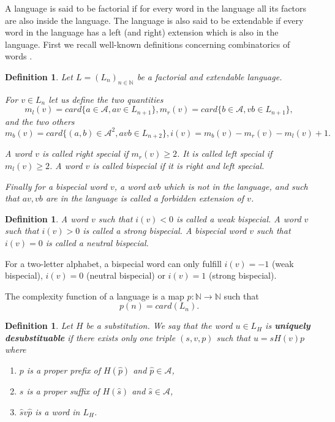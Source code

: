 \documentclass[11 pt]{article}
\newtheorem{definition}[proposition]{Definition}
\newcommand {\CL}{{\mathcal L}}
\newcommand{\wh}{\widehat}
\theoremstyle{definition}
\begin{document}
A language is said to be factorial if for every word in the language all its factors are also inside the language. The language is also said to be extendable if every word in the language has a left (and right) extension which is also in the language. First we recall well-known definitions concerning combinatorics of words \cite{Cass.94}. 
\begin{definition}\label{def-bispe}
Let $L=(L_n)_{n\in\mathbb{N}}$ be a factorial and extendable language. 

 For $v \in L_n$ let us define the two quantities
$$
m_{l}(v)= card\{a\in \mathcal{A}, av\in L_{n+1}\},  m_{r}(v)= card\{b\in \mathcal{A},vb\in L_{n+1}\},$$
and the two others
$$m_{b}(v)= card\{(a,b)\in \mathcal{A}^2, avb\in L_{n+2}\},
i(v) = m_b(v)-m_r(v)-m_l(v)+1.$$

A word $v$ is called right special if $m_{r}(v)\geq 2$. It is called left special if $m_{l}(v)\geq 2$. A word $v$ is called bispecial if it is right and left special. 

Finally for a bispecial word $v$, a word $avb$ which is not in the language, and such that $av, vb$ are in the language is called a forbidden extension of $v$.

\end{definition}

\begin{definition}
A  word $v$ such that $i(v)< 0$ is called a weak bispecial. 
A word $v$ such that $i(v)>0$ is called a strong bispecial.
A bispecial word $v$ such that $i(v)=0$ is called a neutral bispecial.
\end{definition}
For a two-letter alphabet, a bispecial word can only fulfill $i(v)=-1$ (weak bispecial), $i(v)=0$ (neutral bispecial) or $i(v)=1$ (strong bispecial).

The complexity function of a language is a map $p:\mathbb N\rightarrow \mathbb N$ such that 
$$p(n)=card (L_n).$$

 

%
\begin{definition}
Let $H$ be a substitution. 
We say that the word $u\in L_H$ is {\bf uniquely desubstituable} if there exists only one triple $(s,v,p)$ such that $u=sH(v)p$ %
where 
\begin{enumerate}
\item $p$ is a proper prefix of $H(\wh p)$ and $\wh p\in \mathcal A$,
\item $s$ is a proper suffix of $H(\wh s)$ and $\wh s\in \mathcal A$,
\item $\wh s v\wh p$ is a word in $L_{H}$.
\end{enumerate}
 \end{definition}
 
\end{document}
